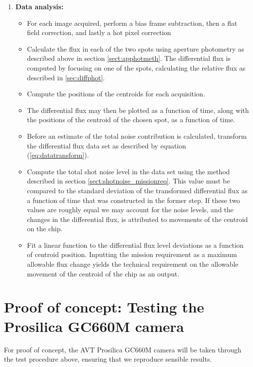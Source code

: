 \documentclass[../main.tex]{subfiles}
\begin{document}
\begin{enumerate}
\begin{itemize}
	\end{itemize}
	\item \textbf{Data analysis:}
	\begin{itemize}
		\item For each image acquired, perform a bias frame subtraction, then a flat field correction, and lastly a hot pixel correction
		\item Calculate the flux in each of the two spots using aperture photometry as described above in section \ref{sect:apphotmeth}. The differential flux is computed by focusing on one of the spots, calculating the relative flux as described in \ref{sec:diffphot}.
		\item Compute the positions of the centroids for each acquisition.
		\item The differential flux may then be plotted as a function of time, along with the positions of the centroid of the chosen spot, as a function of time.
		\item Before an estimate of the total noise contribution is calculated, transform the differential flux data set as described by equation (\ref{eq:datatransform}).
		\item Compute the total shot noise level in the data set using the method described in section \ref{sect:shotnoise_missionreq}. This value must be compared to the standard deviation of the transformed differential flux as a function of time that was constructed in the former step. If these two values are roughly equal we may account for the noise levels, and the changes in the differential flux, is attributed to movements of the centroid on the chip.
		\item Fit a linear function to the differential flux level deviations as a function of centroid position. Inputting the mission requirement as a maximum allowable flux change yields the technical requirement on the allowable movement of the centroid of the chip as an output. 
	\end{itemize}
\end{enumerate}

\clearpage
\section{Proof of concept: Testing the Prosilica GC660M camera}

For proof of concept, the AVT Prosilica GC660M camera will be taken through the test procedure above, ensuring that we reproduce sensible results. 
\end{document}
